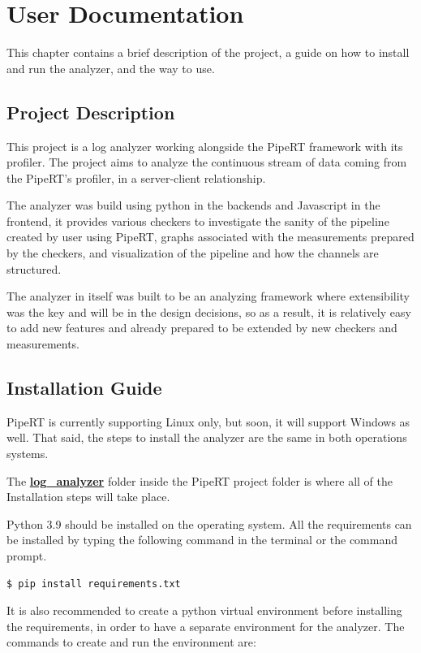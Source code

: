 \chapter{User Documentation} %
\label{ch:user}

This chapter contains a brief description of the project, a guide on how
to install and run the analyzer, and the way to use.

\section{Project Description} %
This project is a log analyzer working alongside the PipeRT framework
with its profiler. The project aims to analyze the continuous stream of
data coming from the PipeRT's profiler, in a server-client relationship.

The analyzer was build using python in the backends and Javascript in the frontend,
it provides various checkers to investigate the sanity of the pipeline created by
user using PipeRT, graphs associated with the measurements prepared by the checkers, and visualization
of the pipeline and how the channels are structured.

The analyzer in itself was built to be an analyzing framework where
extensibility was the key and will be in the design decisions, so as a result,
it is relatively easy to add new features and already prepared to be extended
by new checkers and measurements.


\section{Installation Guide}
PipeRT is currently supporting Linux only, but soon,
it will support Windows as well. That said, the steps to install
the analyzer are the same in both operations systems.

The \textbf{\url{log_analyzer}} folder inside the PipeRT project folder
is where all of the Installation steps will take place.

Python 3.9 should be installed on the operating system. All the
requirements can be installed by typing the following command in
the terminal or the command prompt.

\begin{lstlisting}[language=bash]
	$ pip install requirements.txt
\end{lstlisting}

It is also recommended to create a python virtual environment
before installing the requirements, in order to have a separate
environment for the analyzer. The commands to create and run the environment
are:

